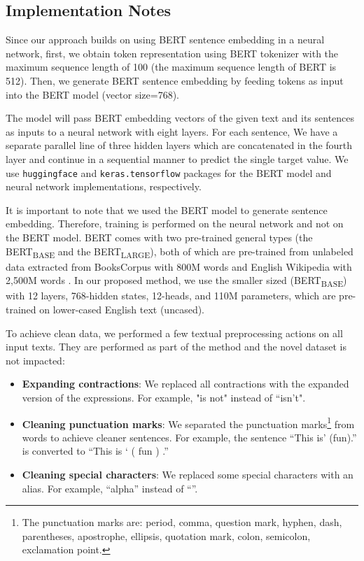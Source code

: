 \documentclass{article}
\begin{document}
\subsection{Implementation Notes}
\label{sec:impl}
Since our approach builds on using BERT sentence embedding in a neural network, first, we obtain token representation using BERT tokenizer with the maximum sequence length of 100 (the maximum sequence length of BERT is 512). Then, we generate BERT sentence embedding by feeding tokens as input into the BERT model (vector size=768). 

The model will pass BERT embedding vectors of the given text and its sentences as inputs to a neural network with eight layers. For each sentence, We have a separate parallel line of three hidden layers which are concatenated in the fourth layer and continue in a sequential manner to predict the single target value. We use \verb+huggingface+ and \verb+keras.tensorflow+ packages for the BERT model and neural network implementations, respectively.

It is important to note that we used the BERT model to generate sentence embedding. Therefore, training is performed on the neural network and not on the BERT model. BERT comes with two pre-trained general types (the BERT\textsubscript{BASE} and the BERT\textsubscript{LARGE}), both of which are pre-trained from unlabeled data extracted from BooksCorpus \cite{zhu2015aligning} with 800M words and English Wikipedia with 2,500M words \cite{devlin2018bert}. In our proposed method, we use the smaller sized (BERT\textsubscript{BASE}) with 12 layers, 768-hidden states, 12-heads, and 110M parameters, which are pre-trained on lower-cased English text (uncased).

To achieve clean data, we performed a few textual preprocessing actions on all input texts. They are performed as part of the method and the novel dataset is not impacted:

\begin{itemize}
    \item \textbf{Expanding contractions}: We replaced all contractions with the expanded version of the expressions. For example, "is not" instead of “isn’t".
    \item \textbf{Cleaning punctuation marks}: We separated the punctuation marks\footnote{The punctuation marks are: period, comma, question mark, hyphen, dash, parentheses, apostrophe, ellipsis, quotation mark, colon, semicolon, exclamation point.} from words to achieve cleaner sentences. For example, the sentence “This is’ (fun).” is converted to “This is ‘ ( fun ) .”
    \item \textbf{Cleaning special characters}: We replaced some special characters with an alias. For example, “alpha” instead of “”.
\end{itemize}
\end{document}
